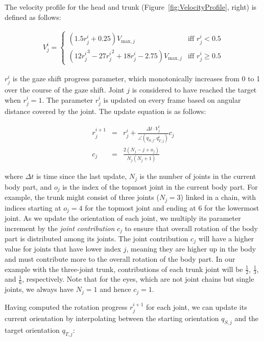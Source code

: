 The velocity profile for the head and trunk (Figure~\ref{fig:VelocityProfile}, right) is defined as follows:

\begin{align} \label{eq:HeadTrunkVelocity}
V^i_j = \begin{cases}
(1.5r^i_j + 0.25)V_{\mathrm{max},j} & \mbox{iff } r^i_j < 0.5 \\
(12{r^i_j}^3 - 27{r^i_j}^2 + 18r^i_j - 2.75)V_{\mathrm{max},j} & \mbox{iff } r^i_j \geq 0.5
\end{cases}
\end{align}

$r^i_j$ is the gaze shift progress parameter, which monotonically increases from 0 to 1 over the course of the gaze shift. Joint $j$ is considered to have reached the target when $r^i_j = 1$. The parameter $r^i_j$ is updated on every frame based on angular distance covered by the joint. The update equation is as follows:

\begin{eqnarray} \label{eq:RotProgressUpdate}
r^{i+1}_j &=& r^i_j + \frac{\Delta t \cdot V^i_j}{\angle(q_{S,j}, q^i_{T,j})} c_j \\
c_j &=& \frac{2(N_j-j+o_j)}{N_j(N_j+1)} \nonumber
\end{eqnarray}

where $\Delta t$ is time since the last update, $N_j$ is the number of joints in the current body part, and $o_j$ is the index of the topmost joint in the current body part. For example, the trunk might consist of three joints ($N_j = 3$) linked in a chain, with indices starting at $o_j = 4$ for the topmost joint and ending at 6 for the lowermost joint. As we update the orientation of each joint, we multiply its parameter increment by the \emph{joint contribution} $c_j$ to ensure that overall rotation of the body part is distributed among its joints. The joint contribution $c_j$ will have a higher value for joints that have lower index $j$, meaning they are higher up in the body and must contribute more to the overall rotation of the body part. In our example with the three-joint trunk, contributions of each trunk joint will be $\frac{1}{2}$, $\frac{1}{3}$, and $\frac{1}{6}$, respectively. Note that for the eyes, which are not joint chains but single joints, we always have $N_j = 1$ and hence $c_j = 1$.

Having computed the rotation progress $r^{i+1}_j$ for each joint, we can update its current orientation by interpolating between the starting orientation $q_{S,j}$ and the target orientation $q_{T,j}$:

